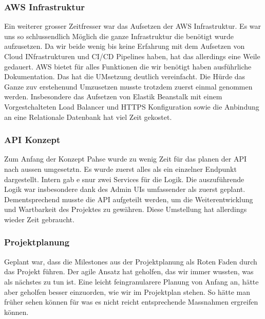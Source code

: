 \subsubsection*{AWS Infrastruktur}

Ein weiterer grosser Zeitfresser war das Aufsetzen der AWS Infrastruktur.
Es war uns so schlussendlich Möglich die ganze Infrastruktur die benötigt wurde aufzusetzen.
Da wir beide wenig bis keine Erfahrung mit dem Aufsetzen von Cloud INfrastrukturen und CI/CD Pipelines haben, hat das allerdings eine Weile gedauert.
AWS bietet für alles Funktionen die wir benötigt haben ausführliche Dokumentation.
Das hat die UMsetzung deutlich vereinfacht.
Die Hürde das Ganze zuv erstehenund Umzusetzen musste trotzdem zuerst einmal genommen werden.
Insbesondere das Aufsetzen von Elastik Beanstalk mit einem Vorgestchalteten Load Balancer und HTTPS Konfiguration sowie die Anbindung an eine Relationale Datenbank hat viel Zeit gekostet.

\clearpage

\subsubsection*{API Konzept}

Zum Anfang der Konzept Pahse wurde zu wenig Zeit für das planen der API nach aussen umgesetztn.
Es wurde zuerst alles als ein einzelner Endpunkt dargestellt.
Intern gab e snur zwei Services für die Logik.
Die auszuführende Logik war insbesondere dank des Admin UIs umfassender als zuerst geplant.
Dementsprechend musste die API aufgeteilt werden, um die Weiterentwicklung und Wartbarkeit des Projektes zu gewähren.
Diese Umstellung hat allerdings wieder Zeit gebraucht.


\subsubsection*{Projektplanung}

Geplant war, dass die Milestones aus der Projektplanung als Roten Faden durch das Projekt führen.
Der agile Ansatz hat geholfen, das wir immer wussten, was als nächstes zu tun ist.
Eine leicht feingranularere Planung von Anfang an, hätte aber geholfen besser einzuorden, wie wir im Projektplan stehen.
So hätte man früher sehen können für was es nicht reicht entsprechende Massnahmen ergreifen können.

\clearpage
